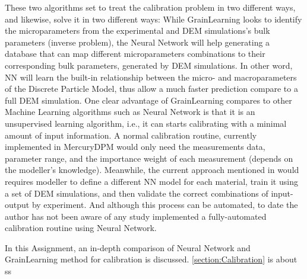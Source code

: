 \documentclass[../BachelorAssignment.tex]{subfiles}
\begin{document}
These two algorithms set to treat the calibration problem in two different ways, and likewise, solve it in two different ways: While GrainLearning looks to identify the microparameters from the experimental and DEM simulations's bulk parameters (inverse problem), the Neural Network will help generating a database that can map different microparameters combinations to their corresponding bulk parameters, generated by DEM simulations. In other word, NN will learn the built-in relationship between the micro- and macroparameters of the Discrete Particle Model, thus allow a much faster prediction compare to a full DEM simulation. One clear advantage of GrainLearning compares to other Machine Learning algorithms such as Neural Network is that it is an unsupervised learning algorithm, i.e., it can starts calibrating with a minimal amount of input information. A normal calibration routine, currently implemented in MercuryDPM would only need the measurements data, parameter range, and the importance weight of each measurement (depends on the modeller's knowledge). Meanwhile, the current approach mentioned in \cite{nn-calibration, NN-GA, NN-coarse} would requires modeller to define a different NN model for each material, train it using a set of DEM simulations, and then validate the correct combinations of input-output by experiment. And although this process can be automated, to date the author has not been aware of any study implemented a fully-automated calibration routine using Neural Network. 

In this Assignment, an in-depth comparison of Neural Network and GrainLearning method for calibration is discussed. \ref{section:Calibration} is about ss


\end{document}

